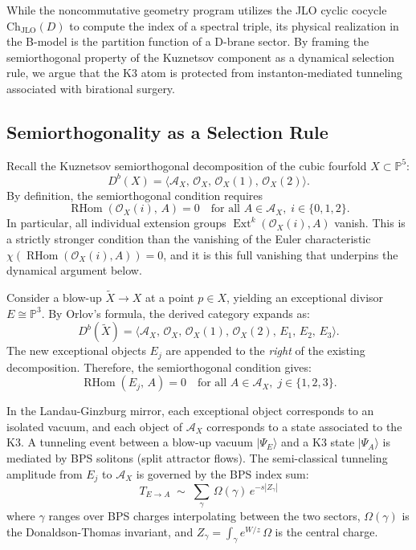 \documentclass[12pt,reqno]{amsart}
\theoremstyle{remark} \newtheorem{remark}[theorem]{Remark}
\begin{document}
While the noncommutative geometry program utilizes the JLO cyclic
cocycle $\mathrm{Ch}_{\mathrm{JLO}}(D)$ to compute the index of a
spectral triple, its physical realization in the B-model is the
partition function of a D-brane sector. By framing the semiorthogonal
property of the Kuznetsov component as a dynamical selection rule, we
argue that the K3 atom is protected from instanton-mediated tunneling
associated with birational surgery.

\subsection{Semiorthogonality as a Selection Rule}

Recall the Kuznetsov semiorthogonal decomposition of the cubic
fourfold $X \subset \mathbb{P}^5$:
\[
  D^b(X) = \langle \mathcal{A}_X,\, \mathcal{O}_X,\,
  \mathcal{O}_X(1),\, \mathcal{O}_X(2) \rangle.
\]
By definition, the semiorthogonal condition requires
\[
  \operatorname{RHom}(\mathcal{O}_X(i),\, A) = 0 \quad \text{for all }
  A \in \mathcal{A}_X,\; i \in \{0,1,2\}.
\]
In particular, all individual extension groups
$\operatorname{Ext}^k(\mathcal{O}_X(i), A)$ vanish.
This is a strictly stronger condition than the
vanishing of the Euler characteristic
$\chi(\operatorname{RHom}(\mathcal{O}_X(i), A)) = 0$, and it is this
full vanishing that underpins the dynamical argument below.

Consider a blow-up $\widetilde{X} \to X$ at a point $p \in X$,
yielding an exceptional divisor $E \cong \mathbb{P}^3$. By Orlov's
formula, the derived category expands as:
\[
  D^b(\widetilde{X}) = \langle \mathcal{A}_X,\, \mathcal{O}_X,\,
  \mathcal{O}_X(1),\, \mathcal{O}_X(2),\, E_1,\, E_2,\, E_3 \rangle.
\]
The new exceptional objects $E_j$ are appended to the \emph{right} of
the existing decomposition. Therefore, the semiorthogonal condition
gives:
\begin{equation}\label{eq:full-vanishing}
  \operatorname{RHom}(E_j,\, A) = 0 \quad \text{for all } A \in
  \mathcal{A}_X,\; j \in \{1,2,3\}.
\end{equation}

In the Landau-Ginzburg mirror, each exceptional object corresponds to
an isolated vacuum, and each object of $\mathcal{A}_X$ corresponds to
a state associated to the K3.  A tunneling event between a blow-up
vacuum $|\Psi_E\rangle$ and a K3 state $|\Psi_A\rangle$ is mediated by
BPS solitons (split attractor flows). The semi-classical tunneling
amplitude from $E_j$ to $\mathcal{A}_X$ is governed by the BPS index
sum:
\begin{equation}\label{eq:tunnel-forward}
  T_{E \to A} \;\sim\; \sum_{\gamma}\, \Omega(\gamma)\,
  e^{-s|Z_\gamma|}
\end{equation}
\noindent where $\gamma$ ranges over BPS charges interpolating between the two
sectors, $\Omega(\gamma)$ is the Donaldson-Thomas invariant, and
$Z_\gamma = \int_\gamma e^{W/z}\,\Omega$ is the central charge.
\end{document}
